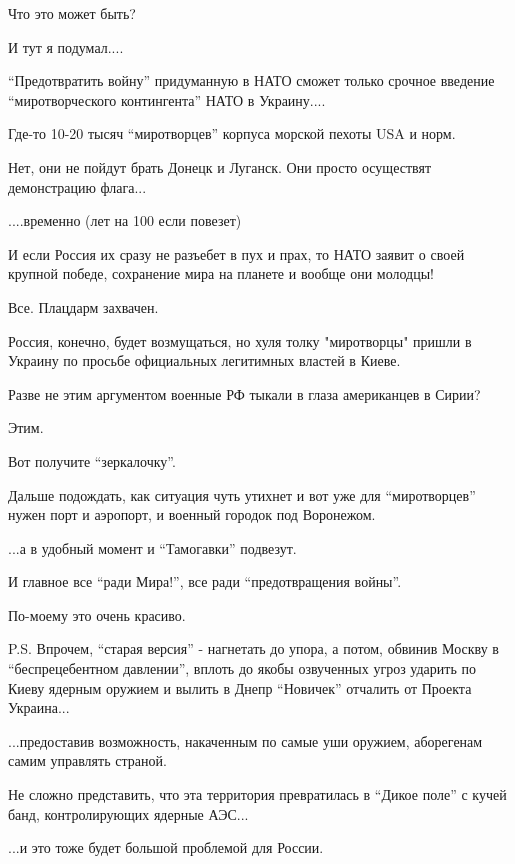 Что это может быть? 

И тут я подумал.... 

\enquote{Предотвратить войну} придуманную в НАТО сможет только срочное введение
\enquote{миротворческого контингента} НАТО в Украину.... 

Где-то 10-20 тысяч \enquote{миротворцев} корпуса морской пехоты USA и норм.

Нет, они не пойдут брать Донецк и Луганск. Они просто осуществят демонстрацию
флага...

....временно (лет на 100 если повезет)

И если Россия их сразу не разъебет в пух и прах, то НАТО заявит о своей крупной
победе, сохранение мира на планете и вообще они молодцы! 

Все. Плацдарм захвачен.

Россия, конечно, будет возмущаться, но хуля толку "миротворцы" пришли в Украину
по просьбе официальных легитимных властей в Киеве.

Разве не этим аргументом военные РФ тыкали в глаза американцев в Сирии?

Этим.

Вот получите \enquote{зеркалочку}.

Дальше подождать, как ситуация чуть утихнет и вот уже для \enquote{миротворцев} нужен
порт и аэропорт, и военный городок под Воронежом. 

...а в удобный момент и \enquote{Тамогавки} подвезут.

И главное все \enquote{ради Мира!}, все ради \enquote{предотвращения войны}. 

По-моему это очень красиво.

P.S. Впрочем, \enquote{старая версия} - нагнетать до упора, а потом, обвинив Москву в
\enquote{беспрецебентном давлении}, вплоть до якобы озвученных угроз ударить по Киеву
ядерным оружием и вылить в Днепр \enquote{Новичек} отчалить от Проекта Украина...

...предоставив возможность, накаченным по самые уши оружием, аборегенам самим
управлять страной.

Не сложно представить, что эта территория превратилась в \enquote{Дикое поле} с кучей
банд, контролирующих ядерные АЭС...

...и это тоже будет большой проблемой для России.
